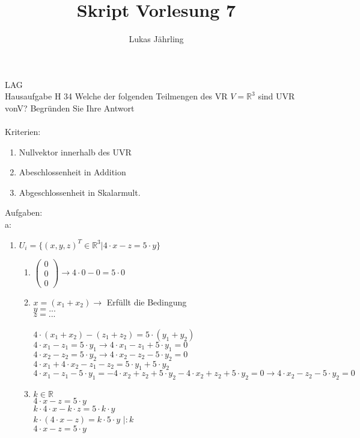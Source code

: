 \documentclass{scrartcl}
\title{Skript Vorlesung 7}
\author{Lukas Jährling}
\begin{document}
LAG\\
Hausaufgabe H 34 Welche der folgenden Teilmengen des VR $V= \mathbb{R}^3$ sind UVR vonV? Begründen Sie Ihre Antwort
\\\\
Kriterien: \begin{enumerate}
\item Nullvektor innerhalb des UVR
\item Abeschlossenheit in Addition
\item Abgeschlossenheit in Skalarmult.
\end{enumerate}
Aufgaben:\\
a:
\begin{enumerate}
	\item
	$U_i = \{ (x,y,z)^T \in \mathbb{R}^3 \vert 4 \cdot x - z = 5\cdot y\}$\\
	\begin{enumerate}
		\item
		$\begin{pmatrix}
			0 \\ 0 \\ 0
		\end{pmatrix} \rightarrow 4 \cdot 0 - 0 = 5 \cdot 0$
		\item
		$x=(x_1+x_2) \rightarrow$ Erfüllt die Bedingung\\
		$y=...$\\
		$z=...$\\\\
		$4 \cdot (x_1 + x_2) - (z_1+z_2) = 5 \cdot (y_1 + y_2)$\\
		$4 \cdot x_1 - z_1 = 5 \cdot y_1 \rightarrow 4 \cdot x_1 - z_1 + 5\cdot y_1 = 0$\\
		$4 \cdot x_2 - z_2 = 5 \cdot y_2 \rightarrow 4 \cdot x_2 - z_2 - 5 \cdot y_2 = 0$\\
		$4 \cdot x_1 + 4 \cdot x_2 - z_1 - z_2 = 5 \cdot y_1 + 5 \cdot y_2$\\
		$4 \cdot x_1 - z_1 - 5\cdot y_1 = - 4 \cdot x_2 + z_2 + 5 \cdot y_2 - 4 \cdot x_2 + z_2 + 5 \cdot y_2 = 0 \rightarrow 4 \cdot x_2 - z_2 - 5 \cdot y_2 =0$
		\item
		$k \in \mathbb{R}$\\
		$4 \cdot x - z = 5 \cdot y$\\
		$k \cdot 4 \cdot x - k \cdot z = 5 \cdot k \cdot y$\\
		$k \cdot (4 \cdot x - z) = k \cdot 5 \cdot y$ \hspace{1cm} $\vert :k$\\
		$4 \cdot x - z = 5\cdot y$
	\end{enumerate}

\end{enumerate}
\end{document}
